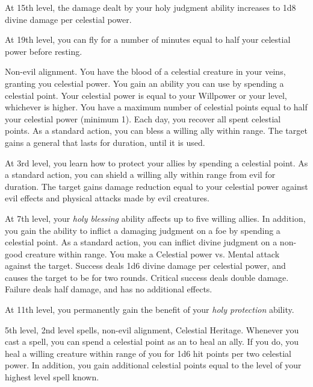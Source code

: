     At 15th level, the damage dealt by your holy judgment ability increases to 1d8 divine damage per celestial power.

    At 19th level, you can fly for a number of minutes equal to half your celestial power before resting.

    \featpres Non-evil alignment.
    \featben You have the blood of a celestial creature in your veins, granting you celestial power.
    You gain an ability you can use by spending a celestial point.
    Your celestial power is equal to your Willpower or your level, whichever is higher.
    You have a maximum number of celestial points equal to half your celestial power (minimum 1).
    Each day, you recover all spent celestial points.
     As a standard action, you can bless a willing ally within \rngclose range. The target gains a general  that lasts for \durshort duration, until it is used.

    At 3rd level, you learn how to protect your allies by spending a celestial point.
     As a standard action, you can shield a willing ally within \rngmed range from evil for \durshort duration. The target gains damage reduction equal to your celestial power against evil effects and physical attacks made by evil creatures.

    At 7th level, your \textit{holy blessing} ability affects up to five willing allies.
    In addition, you gain the ability to inflict a damaging judgment on a foe by spending a celestial point.
     As a standard action, you can inflict divine judgment on a non-good creature within \rngmed range. You make a Celestial power vs. Mental attack against the target. Success deals 1d6 divine damage per celestial power, and causes the target to be \dazed for two rounds. Critical success deals double damage. Failure deals half damage, and has no additional effects.

    At 11th level, you permanently gain the benefit of your \textit{holy protection} ability.

    \featpres 5th level, 2nd level spells, non-evil alignment, Celestial Heritage.
    \featben Whenever you cast a spell, you can spend a celestial point as an  to heal an ally.
    If you do, you heal a willing creature within \rngclose range of you for 1d6 hit points per two celestial power.
    In addition, you gain additional celestial points equal to the level of your highest level spell known.

